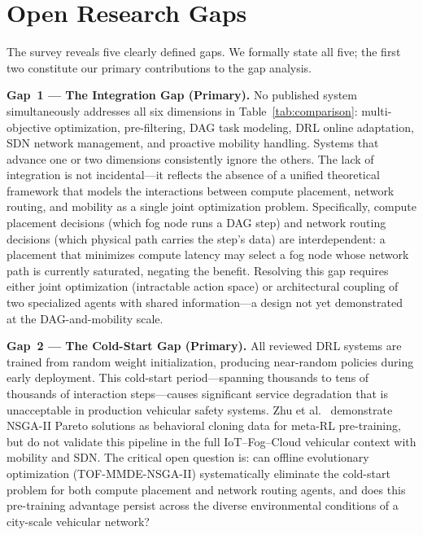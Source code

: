 \documentclass[12pt,a4paper]{article}
\begin{document}
\section{Open Research Gaps}
\label{sec:gaps}

The survey reveals five clearly defined gaps. We formally state all five; the
first two constitute our primary contributions to the gap analysis.

\medskip\noindent\textbf{Gap~1 — The Integration Gap (Primary).}
No published system simultaneously addresses all six dimensions in
Table~\ref{tab:comparison}: multi-objective optimization, pre-filtering,
DAG task modeling, DRL online adaptation, SDN network management, and proactive
mobility handling. Systems that advance one or two dimensions consistently
ignore the others. The lack of integration is not incidental---it reflects the
absence of a unified theoretical framework that models the interactions between
compute placement, network routing, and mobility as a single joint optimization
problem. Specifically, compute placement decisions (which fog node runs a DAG
step) and network routing decisions (which physical path carries the step's data)
are interdependent: a placement that minimizes compute latency may select a fog
node whose network path is currently saturated, negating the benefit. Resolving
this gap requires either joint optimization (intractable action space) or
architectural coupling of two specialized agents with shared information---a
design not yet demonstrated at the DAG-and-mobility scale.


\medskip\noindent\textbf{Gap~2 — The Cold-Start Gap (Primary).}
All reviewed DRL systems are trained from random weight initialization, producing
near-random policies during early deployment. This cold-start period---spanning
thousands to tens of thousands of interaction steps---causes significant service
degradation that is unacceptable in production vehicular safety systems. Zhu
et al.~\cite{zhu2025dag} demonstrate NSGA-II Pareto solutions as behavioral
cloning data for meta-RL pre-training, but do not validate this pipeline in the
full IoT--Fog--Cloud vehicular context with mobility and SDN. The critical
open question is: can offline evolutionary optimization (TOF-MMDE-NSGA-II)
systematically eliminate the cold-start problem for both compute placement and
network routing agents, and does this pre-training advantage persist across the
diverse environmental conditions of a city-scale vehicular network?
\end{document}
